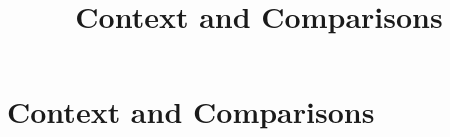 \documentclass[../../OAE-SPEC-MAIN.tex]{subfiles}
\title{Context and Comparisons}
\begin{document}
\chapter{Context and Comparisons}











\end{document}

